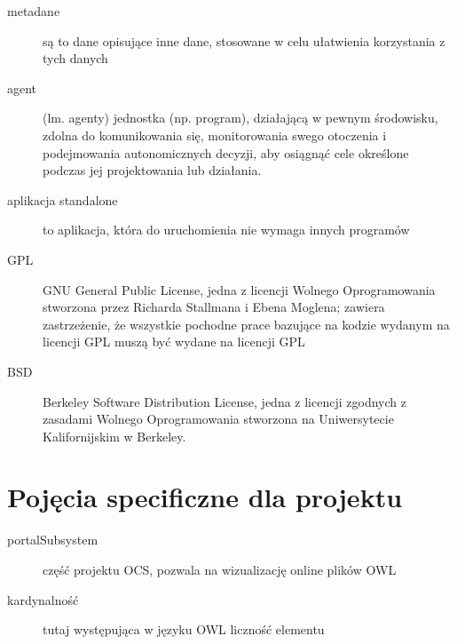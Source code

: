 \documentclass[a4paper,10pt]{article}
\begin{document}
\begin{description}
	\item[metadane] są to dane opisujące inne dane, stosowane w celu ułatwienia korzystania z tych danych
	\item[agent] (lm. agenty) jednostka (np. program), działającą w pewnym środowisku, zdolna do komunikowania się, monitorowania swego otoczenia i podejmowania autonomicznych decyzji, aby osiągnąć cele określone podczas jej projektowania lub działania.
	\item[aplikacja standalone] to aplikacja, która do uruchomienia nie wymaga innych programów
	\item[GPL] GNU General Public License, jedna z licencji Wolnego Oprogramowania stworzona przez Richarda Stallmana i Ebena Moglena; zawiera zastrzeżenie, że wszystkie pochodne prace bazujące na kodzie wydanym na licencji GPL muszą być wydane na licencji GPL 
	\item[BSD] Berkeley Software Distribution License, jedna z licencji zgodnych z zasadami Wolnego Oprogramowania stworzona na Uniwersytecie Kalifornijskim w Berkeley.
\end{description}



\section{Pojęcia specificzne dla projektu}
\begin{description}
 	\item[portalSubsystem] część projektu OCS, pozwala na wizualizację online plików OWL
 	\item[kardynalność] tutaj występująca w języku OWL liczność elementu 
\end{description}



\clearpage
{}
{}
%
\end{document}
